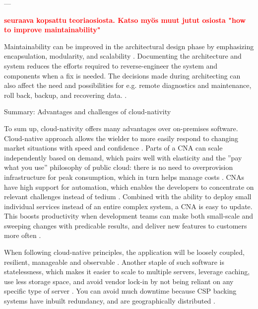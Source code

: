 \documentclass[utf8,english]{gradu3}
\newcommand{\todo}[1]{\textbf{\textcolor{red}{#1}}}
\begin{document}
---

\todo{seuraava kopsattu teoriaosiosta. Katso myös muut jutut osiosta "how to improve maintainability"}

Maintainability can be improved in the architectural design phase by emphasizing
encapsulation, modularity, and scalability \parencite{IEEE12207}.
Documenting the architecture and
system reduces the efforts required to reverse-engineer the system and
components when a fix is needed. The decisions made during architecting can also
affect the need and possibilities for e.g. remote diagnostics and maintenance,
roll back, backup, and recovering data. \parencite[95-96]{IEEE12207}.

Summary: Advantages and challenges of cloud-nativity

To sum up, cloud-nativity offers many advantages over on-premises software.
Cloud-native approach allows the wielder to more easily respond to changing
market situations with speed and confidence \parencite{Microsoft2022-CNA}. Parts of
a CNA can scale independently based on demand, which pairs well with elasticity
and the ''pay what you use'' philosophy of public cloud: there is no need to
overprovision infrastructure for peak consumption, which in turn helps manage
costs \parencite{Patrizio2018}. CNAs have high support for automation, which
enables the developers to concentrate on relevant challenges instead of tedium
\parencite{Patrizio2018}. Combined with the ability to deploy small individual
services instead of an entire complex system, a CNA is easy to update. This
boosts productivity when development teams can make both small-scale and
sweeping changes with predicable results, and deliver new features to customers
more often \parencite{CNAF2018, Patrizio2018}.

When following cloud-native principles, the application will be loosely coupled,
resilient, manageable and observable \parencite{CNAF2018}. Another staple of
such software is statelessness, which makes it easier to scale to multiple
servers, leverage caching, use less storage space, and avoid vendor lock-in by
not being reliant on any specific type of server \parencite{Patrizio2018}. You
can avoid much downtime because CSP backing systems have inbuilt redundancy, and
are geographically distributed \parencite{Patrizio2018}.
\end{document}
